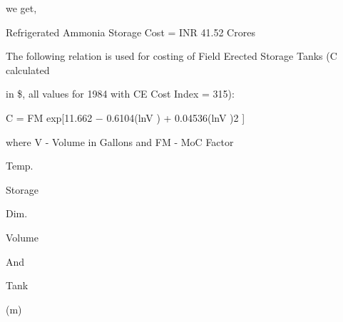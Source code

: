 \documentclass[a4paper,portrait,12pt]{article}
\begin{document}
\begin{flushleft}
we get,
\end{flushleft}


\begin{flushleft}
Refrigerated Ammonia Storage Cost = INR 41.52 Crores
\end{flushleft}


\begin{flushleft}
The following relation is used for costing of Field Erected Storage Tanks (C calculated
\end{flushleft}


\begin{flushleft}
in \$, all values for 1984 with CE Cost Index = 315):
\end{flushleft}


\begin{flushleft}
C = FM exp[11.662 $-$ 0.6104(lnV ) + 0.04536(lnV )2 ]
\end{flushleft}


\begin{flushleft}
where V - Volume in Gallons and FM - MoC Factor
\end{flushleft}


\begin{flushleft}
Temp.
\end{flushleft}


\begin{flushleft}
Storage
\end{flushleft}





\begin{flushleft}
Dim.
\end{flushleft}





\begin{flushleft}
Volume
\end{flushleft}


\begin{flushleft}
And
\end{flushleft}





\begin{flushleft}
Tank
\end{flushleft}





\begin{flushleft}
(m)
\end{flushleft}
\end{document}
